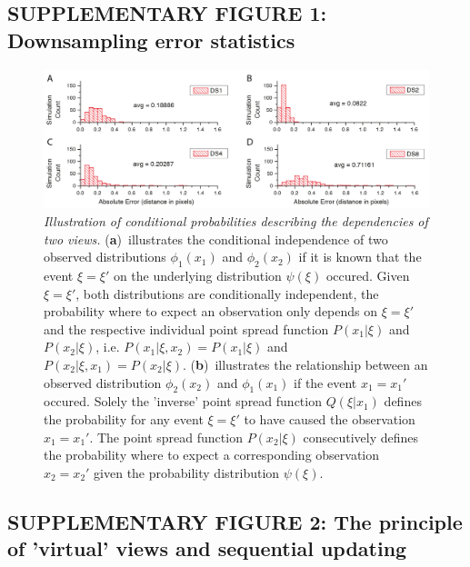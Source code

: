 \documentclass[]{spie}  %
\begin{document}
\hspace{20mm}

\subsection*{SUPPLEMENTARY FIGURE 1: Downsampling error statistics}

\vspace{1mm}

\begin{figure}[h!]
\includegraphics[width=\textwidth]{fig-downsampling-statistics-1.png}
\vspace{-2.0mm}
\caption{\hspace{-0.5mm} \emph{Illustration of conditional probabilities describing the dependencies of two views.} \mbox{(\textbf{a}) illustrates} the conditional independence of two observed distributions $\phi_1(x_1)$ and $\phi_2(x_2)$ if it is known that the event $\xi=\xi'$ on the underlying distribution $\psi(\xi)$ occured. Given $\xi=\xi'$, both distributions are conditionally independent, the probability where to expect an observation only depends on $\xi=\xi'$ and the respective individual point spread function $P(x_1|\xi)$ and $P(x_2|\xi)$, i.e. $P(x_1|\xi,x_2) = P(x_1|\xi)$ and $P(x_2|\xi,x_1) = P(x_2|\xi)$. \mbox{(\textbf{b}) illustrates} the relationship between an observed distribution $\phi_2(x_2)$ and $\phi_1(x_1)$ if the event $x_1=x_1'$ occured. Solely the 'inverse' point spread function $Q(\xi|x_1)$ defines the probability for any event $\xi=\xi'$ to have caused the observation $x_1=x_1'$. The point spread function $P(x_2|\xi)$ consecutively defines the probability where to expect a corresponding observation $x_2=x_2'$ given the probability distribution $\psi(\xi)$.
}
\label{fig:ds-stats-01}
\end{figure}

\pagebreak

\vspace{10mm}

\subsection*{SUPPLEMENTARY FIGURE 2: The principle of 'virtual' views and sequential updating}
\end{document}
